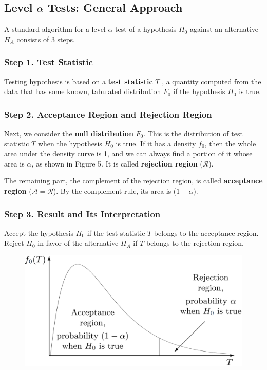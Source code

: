 \subsection{Level \texorpdfstring{$\alpha$}{alpha} Tests: General Approach}
\label{subsec:level-alpha-tests}

A standard algorithm for a level $\alpha$ test of a hypothesis $H_0$ against an alternative $H_A$ consists of 3 steps.

\subsubsection*{Step 1. Test Statistic}

Testing hypothesis is based on a \textbf{test statistic} $T$ , a quantity computed from the data that has some known, tabulated distribution $F_0$ if the hypothesis $H_0$ is true.

\subsubsection*{Step 2. Acceptance Region and Rejection Region}

Next, we consider the \textbf{null distribution} $F_0$. This is the distribution of test statistic $T$ when the hypothesis $H_0$ is true. If it has a density $f_0$, then the whole area under the density curve is 1, and we can always find a portion of it whose area is $\alpha$, as shown in Figure 5. It is called \textbf{rejection region} ($\mathcal{R}$).

The remaining part, the complement of the rejection region, is called \textbf{acceptance region} ($\mathcal{A = \overline{R}}$). By the complement rule, its area is ($1 - \alpha$).

\subsubsection*{Step 3. Result and Its Interpretation}

Accept the hypothesis $H_0$ if the test statistic $T$ belongs to the acceptance region. Reject $H_0$ in favor of the alternative $H_A$ if $T$ belongs to the rejection region.

\begin{figure}[H]
  \centering
  \includegraphics[width=\linewidth]{img/fig-9.6.png}
  \caption{}
  \label{fig:9.6}
\end{figure}
